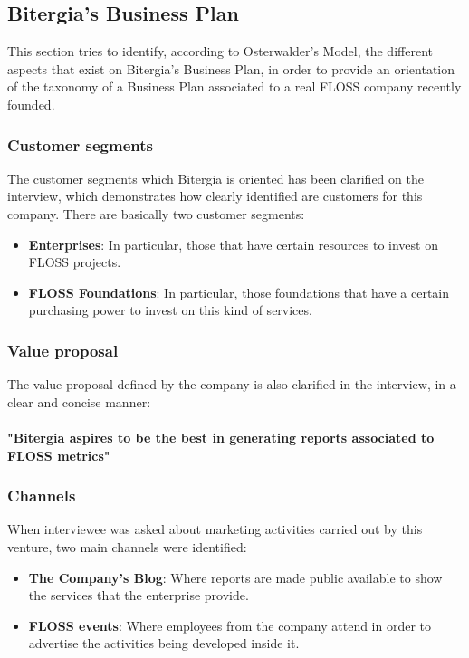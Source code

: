 \documentclass[11pt]{article}
\begin{document}
\subsection{Bitergia's Business Plan}
This section tries to identify, according to Osterwalder's Model, the different aspects that exist on Bitergia's Business Plan, in order to provide an orientation of the taxonomy of a Business Plan associated to a real FLOSS company recently founded.
\subsubsection{Customer segments}
The customer segments which Bitergia is oriented has been clarified on the interview, which demonstrates how clearly identified are customers for this company. There are basically two customer segments:
\begin{itemize}
\item{\textbf{Enterprises}: In particular, those that have certain resources to invest on FLOSS projects.}
\item{\textbf{FLOSS Foundations}: In particular, those foundations that have a certain purchasing power to invest on this kind of services.}
\end{itemize}
\subsubsection{Value proposal}
The value proposal defined by the company is also clarified in the interview, in a clear and concise manner:\\
\\
\textbf{"Bitergia aspires to be the best in generating reports associated to FLOSS metrics"}
\subsubsection{Channels}
When interviewee was asked about marketing activities carried out by this venture, two main channels were identified:
\begin{itemize}
\item{\textbf{The Company's Blog}: Where reports are made public available to show the services that the enterprise provide.}
\item{\textbf{FLOSS events}: Where employees from the company attend in order to advertise the activities being developed inside it.}
\end{itemize}
\end{document}
